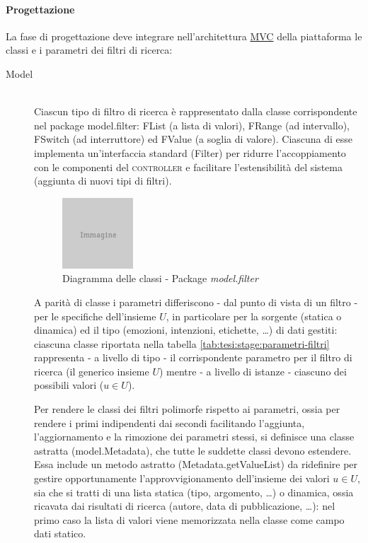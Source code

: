 \paragraph{Progettazione} La fase di progettazione deve integrare nell'architettura \underline{MVC} della piattaforma le classi e i parametri dei filtri di ricerca:
\begin{description}
  \item[Model] \hfill \\
  Ciascun tipo di filtro di ricerca è rappresentato dalla classe corrispondente nel package \textsf{model.filter}: \textsf{FList} (a lista di valori), \textsf{FRange} (ad intervallo), \textsf{FSwitch} (ad interruttore) ed \textsf{FValue} (a soglia di valore). Ciascuna di esse implementa un'interfaccia standard (\textsf{Filter}) per ridurre l'accoppiamento con le componenti del \textsc{controller} e facilitare l'estensibilità del sistema (aggiunta di nuovi tipi di filtri).

\begin{figure}[ht]
	\begin{center}
		\includegraphics{placeholder.png}
		\caption{Diagramma delle classi - Package \textit{model.filter}}
		\label{fig:tesi:stage:design:model-filter-classi}
	\end{center}
\end{figure}

  A parità di classe i parametri differiscono - dal punto di vista di un filtro - per le specifiche dell'insieme $U$, in particolare per la sorgente (statica o dinamica) ed il tipo (emozioni, intenzioni, etichette, \ldots) di dati gestiti: ciascuna classe riportata nella tabella \ref{tab:tesi:stage:parametri-filtri} rappresenta - a livello di tipo - il corrispondente parametro per il filtro di ricerca (il generico insieme $U$) mentre - a livello di istanze - ciascuno dei possibili valori ($u \in U$).

	Per rendere le classi dei filtri polimorfe rispetto ai parametri, ossia per rendere i primi indipendenti dai secondi facilitando l'aggiunta, l'aggiornamento e la rimozione dei parametri stessi, si definisce una classe astratta (\textsf{model.Metadata}), che tutte le suddette classi devono estendere. Essa include un metodo astratto (\textsf{Metadata.getValueList}) da ridefinire per gestire opportunamente l'approvvigionamento dell'insieme dei valori $u \in U$, sia che si tratti di una lista statica (tipo, argomento, \ldots) o dinamica, ossia ricavata dai risultati di ricerca (autore, data di pubblicazione, \ldots): nel primo caso la lista di valori viene memorizzata nella classe come campo dati statico.


\end{description}
